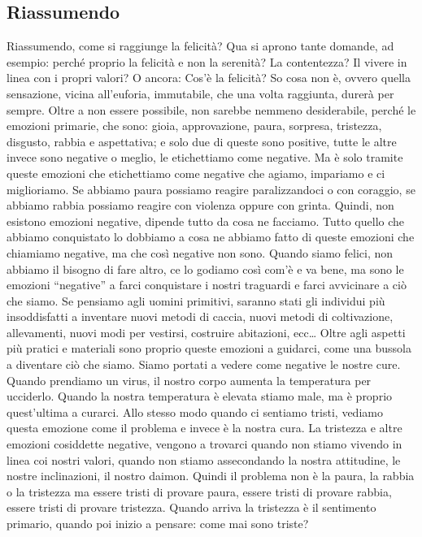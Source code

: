 \documentclass[12pt]{book} %
\begin{document}
\subsection{Riassumendo}
Riassumendo, come si raggiunge la felicità? Qua si aprono tante domande, ad esempio: perché proprio la felicità e non la
serenità? La contentezza? Il vivere in linea con i propri valori? O ancora: Cos'è la felicità? So
cosa non è, ovvero quella sensazione, vicina all'euforia, immutabile, che una volta raggiunta,
durerà per sempre. Oltre a non essere possibile, non sarebbe nemmeno desiderabile, perché le emozioni primarie, che
sono: gioia, approvazione, paura, sorpresa, tristezza, disgusto, rabbia e aspettativa; e solo due di queste sono
positive, tutte le altre invece sono negative o meglio, le etichettiamo come negative. Ma è solo tramite queste
emozioni che etichettiamo come negative che agiamo, impariamo e ci miglioriamo. Se abbiamo paura possiamo reagire
paralizzandoci o con coraggio, se abbiamo rabbia possiamo reagire con violenza oppure con grinta. Quindi, non esistono
emozioni negative, dipende tutto da cosa ne facciamo. Tutto quello che abbiamo conquistato lo dobbiamo a cosa ne
abbiamo fatto di queste emozioni che chiamiamo negative, ma che così negative non sono. Quando siamo felici, non
abbiamo il bisogno di fare altro, ce lo godiamo così com'è e va bene, ma sono le emozioni
“negative” a farci conquistare i nostri traguardi e farci avvicinare a ciò che siamo. Se pensiamo agli uomini
primitivi, saranno stati gli individui più insoddisfatti a inventare nuovi metodi di caccia, nuovi metodi di
coltivazione, allevamenti, nuovi modi per vestirsi, costruire abitazioni, ecc… Oltre agli aspetti più pratici e
materiali sono proprio queste emozioni a guidarci, come una bussola a diventare ciò che siamo. Siamo portati a vedere
come negative le nostre cure. Quando prendiamo un virus, il nostro corpo aumenta la temperatura per ucciderlo. Quando
la nostra temperatura è elevata stiamo male, ma è proprio quest'ultima a curarci. Allo stesso modo
quando ci sentiamo tristi, vediamo questa emozione come il problema e invece è la nostra cura. La tristezza e altre
emozioni cosiddette negative, vengono a trovarci quando non stiamo vivendo in linea coi nostri valori, quando non
stiamo assecondando la nostra attitudine, le nostre inclinazioni, il nostro daimon. Quindi il problema non è la paura,
la rabbia o la tristezza ma essere tristi di provare paura, essere tristi di provare rabbia, essere tristi di provare
tristezza. Quando arriva la tristezza è il sentimento primario, quando poi inizio a pensare: come mai sono triste?
\end{document}
